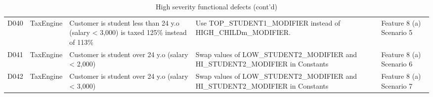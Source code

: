 
\begin{table}[H]
\footnotesize 
\begin{tabularx}{\textwidth}{| c | P | X | X | P |}
\hline %
 &  &  &  &  \\
\hline %
D040
& TaxEngine
& Customer is student less than 24 y.o (salary < 3,000) is taxed 125\% instead of 113\%
& Use TOP\_STUDENT1\_MODIFIER instead of HIGH\_CHILDm\_MODIFIER. 
& Feature 8 (a) Scenario 5\\
\hline %
D041
& TaxEngine
& Customer is student over 24 y.o (salary < 2,000)
& Swap values of LOW\_STUDENT2\_MODIFIER and HI\_STUDENT2\_MODIFIER in Constants
& Feature 8 (a) Scenario 6\\
\hline %
D042
& TaxEngine
& Customer is student over 24 y.o (salary < 3,000)
& Swap values of LOW\_STUDENT2\_MODIFIER and HI\_STUDENT2\_MODIFIER in Constants
& Feature 8 (a) Scenario 7\\
\hline %
\end{tabularx}
\caption{High severity functional defects (cont'd)}
\end{table}